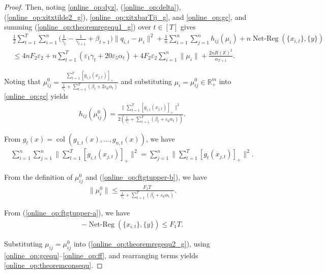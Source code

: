 \documentclass[12pt,draftcls,onecolumn]{IEEEtran}%
\DeclareMathOperator{\NetReg}{Net-Reg}
\DeclareMathOperator{\col}{col}
\begin{document}
\begin{proof}
Then, noting \eqref{online_op:dyz}, (\ref{online_op:delta}), (\ref{online_op:xitxtilde2_g}), \eqref{online_op:xitxbarTij_g}, and \eqref{online_op:gc}, and summing (\ref{online_op:theoremregequ1_g}) over $t\in[T]$ gives
\begin{align}\label{online_op:theoremregequ2_g}
&\frac{1}{2}\sum_{t=1}^T\sum_{i=1}^n
\Big(\frac{1}{\gamma_{t}}-\frac{1}{\gamma_{t+1}}+\beta_{t+1}\Big)
\|q_{i,t}-\mu_i\|^2+\frac{1}{n}\sum_{i=1}^n\sum_{j=1}^nh_{ij}(\mu_i)+n\NetReg(\{x_{i,t}\},\{y\})\nonumber\\
&\le 4nF_2\varepsilon_2+n\sum_{t=1}^T(\varepsilon_1\gamma_{t}+20\varepsilon_5\alpha_{t})
+4F_2\varepsilon_2\sum_{i=1}^n\|\mu_i\|+\frac{2nR(\mathbb{X})^2}{\alpha_{T+1}}.
\end{align}

Noting that $\mu_{ij}^0=\frac{\sum_{t=1}^T[g_{i,t}(x_{j,t})]_+}
{\frac{1}{\gamma_1}
	+\sum_{t=1}^T(\beta_{t}+2\varepsilon_6\alpha_{t})}$ and substituting $\mu_i=\mu_{ij}^0\in\mathbb{R}^m_{+}$ into \eqref{online_op:gc} yields
\begin{align}\label{online_op:gcequ}
h_{ij}(\mu_{ij}^0)=\frac{\|\sum_{t=1}^T[g_{i,t}(x_{j,t})]_+\Big\|^2}
{2(\frac{1}{\gamma_1}
+\sum_{t=1}^T(\beta_{t}+\varepsilon_6\alpha_{t}))}.
\end{align}

From $g_t(x)=\col(g_{1,t}(x),\dots,g_{n,t}(x))$, we have
\begin{align}
\sum_{i=1}^n\sum_{j=1}^n\Big\|\sum_{t=1}^T[g_{i,t}(x_{j,t})]_+\Big\|^2
=\sum_{j=1}^n\Big\|\sum_{t=1}^T[g_{t}(x_{j,t})]_+\Big\|^2.
\end{align}

From the definition of $\mu_{ij}^0$ and (\ref{online_op:ftgtupper-b}), we have
\begin{align}\label{online_op:mu0equ}
\|\mu_i^0\|\le\frac{F_1T}{\frac{1}{\gamma_1}
+\sum_{t=1}^T(\beta_{t}+\varepsilon_6\alpha_{t})}.
\end{align}

From (\ref{online_op:ftgtupper-a}), we have
\begin{align}\label{online_op:ff}
-\NetReg(\{x_{i,t}\},\{y\})\le F_1T.
\end{align}

Substituting $\mu_{ij}=\mu_{ij}^0$ into (\ref{online_op:theoremregequ2_g}), using \eqref{online_op:gcequ}--\eqref{online_op:ff},  and rearranging  terms yields \eqref{online_op:theoremconsequ}.
\end{proof}
\end{document}
